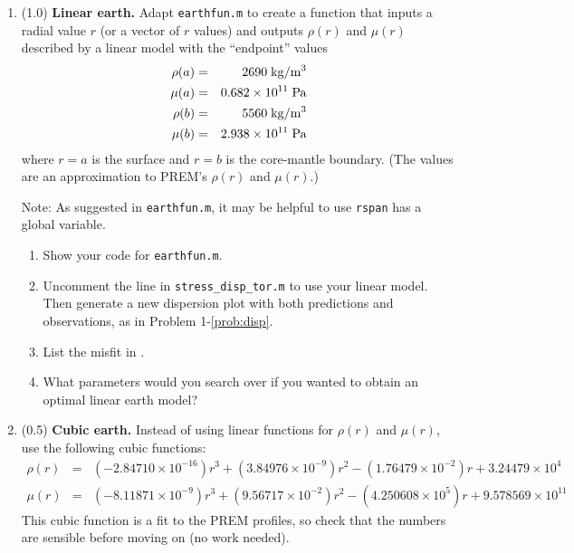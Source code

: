 \documentclass[11pt,titlepage,fleqn]{article}
\begin{document}
\begin{enumerate}
\label{prob:earth_homo}


%
%

\item (1.0) {\bf Linear earth.} Adapt \verb+earthfun.m+ to create a function that inputs a radial value $r$ (or a vector of $r$ values) and outputs $\rho(r)$ and $\mu(r)$ described by a linear model with the ``endpoint'' values
%
\begin{eqnarray*}
\rho(a) &=& 2690 \; {\rm kg/m^3}
\\
\mu(a) &=& 0.682 \times 10^{11} \; {\rm Pa}
\\
\rho(b) &=& 5560 \; {\rm kg/m^3}
\\
\mu(b) &=& 2.938 \times 10^{11} \; {\rm Pa}
\end{eqnarray*}
%
where $r=a$ is the surface and $r=b$ is the core-mantle boundary. (The values are an approximation to PREM's $\rho(r)$ and $\mu(r)$.)

Note: As suggested in \verb+earthfun.m+, it may be helpful to use \verb+rspan+ has a global variable.

\begin{enumerate}
\item Show your code for \verb+earthfun.m+.
\item Uncomment the line in \verb+stress_disp_tor.m+ to use your linear model. Then generate a new dispersion plot with both predictions and observations, as in Problem 1-\ref{prob:disp}.
\item List the misfit in .
\item What parameters would you search over if you wanted to obtain an optimal linear earth model?
\end{enumerate}

\label{prob:earth_linear}


\item (0.5) {\bf Cubic earth.} Instead of using linear functions for $\rho(r)$ and $\mu(r)$, use the following cubic functions:
%
\begin{eqnarray*}
\rho(r) &=& (-2.84710 \times 10^{-16})r^3 + (3.84976 \times 10^{-9})r^2 - (1.76479 \times 10^{-2})r + 3.24479 \times 10^{4}
\\
\mu(r) &=& (-8.11871 \times 10^{-9}) r^3 + (9.56717 \times 10^{-2})r^2 - (4.250608 \times 10^{5})r + 9.578569 \times 10^{11}
\end{eqnarray*}
%
%
This cubic function is a fit to the PREM profiles, so check that the numbers are sensible before moving on (no work needed).


\end{enumerate}
\end{document}
